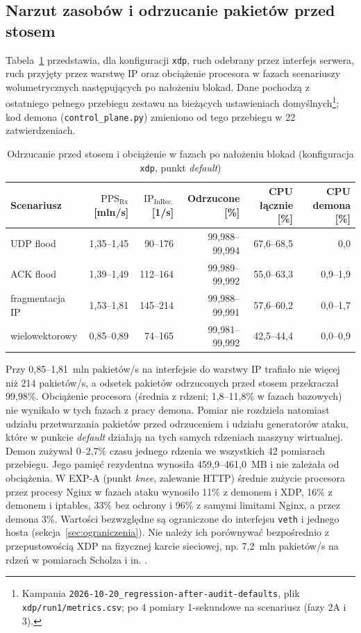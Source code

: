 \documentclass[a4paper,12pt]{article}
\begin{document}
\subsection{Narzut zasobów i odrzucanie pakietów przed stosem}\label{sec:wyniki_narzut}
Tabela~\ref{tab:wyniki_narzut} przedstawia, dla konfiguracji \texttt{xdp}, ruch odebrany przez interfejs serwera, ruch przyjęty przez warstwę IP oraz obciążenie procesora w fazach scenariuszy wolumetrycznych następujących po nałożeniu blokad. Dane pochodzą z ostatniego pełnego przebiegu zestawu na bieżących ustawieniach domyślnych\footnote{\raggedright Kampania \texttt{2026-10-20\_regression-after-audit-defaults}, plik \texttt{xdp/run1/metrics.csv}; po 4 pomiary 1-sekundowe na scenariusz (fazy 2A i 3).}; kod demona (\texttt{control\_plane.py}) zmieniono od tego przebiegu w 22 zatwierdzeniach.

\begin{table}[H]
\centering
\small
\caption{Odrzucanie przed stosem i obciążenie w fazach po nałożeniu blokad (konfiguracja \texttt{xdp}, punkt \textit{default})}\label{tab:wyniki_narzut}
\setlength{\tabcolsep}{4pt}
\begin{tabular}{@{}lrrrrr@{}}
\toprule
Scenariusz & $\mathrm{PPS}_{\mathrm{Rx}}$ [mln/s] & $\mathrm{IP}_{\mathrm{InRec.}}$ [1/s] & Odrzucone [\%] & CPU łącznie [\%] & CPU demona [\%] \\
\midrule
UDP flood & 1,35--1,45 & 90--176 & 99,988--99,994 & 67,6--68,5 & 0,0 \\
ACK flood & 1,39--1,49 & 112--164 & 99,989--99,992 & 55,0--63,3 & 0,9--1,9 \\
fragmentacja IP & 1,53--1,81 & 145--214 & 99,988--99,991 & 57,6--60,2 & 0,0--1,7 \\
wielowektorowy & 0,85--0,89 & 74--165 & 99,981--99,992 & 42,5--44,4 & 0,0--0,9 \\
\bottomrule
\end{tabular}
\end{table}

Przy 0,85--1,81~mln pakietów/s na interfejsie do warstwy IP trafiało nie więcej niż 214 pakietów/s, a odsetek pakietów odrzuconych przed stosem przekraczał 99,98\%. Obciążenie procesora (średnia z rdzeni; 1,8--11,8\% w fazach bazowych) nie wynikało w tych fazach z pracy demona. Pomiar nie rozdziela natomiast udziału przetwarzania pakietów przed odrzuceniem i udziału generatorów ataku, które w punkcie \textit{default} działają na tych samych rdzeniach maszyny wirtualnej. Demon zużywał 0--2,7\% czasu jednego rdzenia we wszystkich 42 pomiarach przebiegu. Jego pamięć rezydentna wynosiła 459,9--461,0~MB i nie zależała od obciążenia. W EXP-A (punkt \textit{knee}, zalewanie HTTP) średnie zużycie procesora przez procesy Nginx w fazach ataku wynosiło 11\% z demonem i XDP, 16\% z demonem i iptables, 33\% bez ochrony i 96\% z samymi limitami Nginx, a przez demona 3\%. Wartości bezwzględne są ograniczone do interfejsu \texttt{veth} i jednego hosta (sekcja~\ref{sec:ograniczenia}). Nie należy ich porównywać bezpośrednio z przepustowością XDP na fizycznej karcie sieciowej, np. 7,2~mln pakietów/s na rdzeń w pomiarach Scholza i in. \cite{scholz2018performance}.
\end{document}
